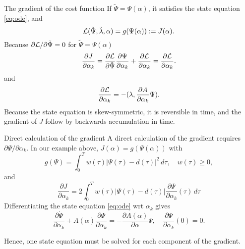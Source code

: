 \documentclass{beamer}
\begin{document}
\begin{frame}{The gradient of the cost function}
  If $\tilde{\Psi} = \Psi(\alpha)$, it satisfies the state equation \eqref{eq:ode}, and
  \[
    {\cal L}(\tilde{\Psi},\tilde{\lambda},\alpha) =
    g(\Psi(\alpha)) := J(\alpha).
  \]
Because $\partial {\cal L}/\partial \tilde{\Psi}=0$ for $\tilde{\Psi}=\Psi(\alpha)$
\[
\frac{\partial J}{\partial \alpha_k} = \frac{\partial {\cal L}}{\partial \tilde{\Psi}}
\frac{\partial{\Psi}}{\partial \alpha_k} + \frac{\partial {\cal L}}{\partial \alpha_k} = \frac{\partial
  {\cal L}}{\partial \alpha_k}. 
\]
and
\[
\frac{\partial{\cal L}}{\partial \alpha_k} = - (\lambda,\frac{\partial A}{\partial \alpha_k}\Psi). 
\]
Because the state equation is skew-symmetric, it is reversible in time, and the gradient of $J$
follow by backwards accumulation in time.
\end{frame}

\begin{frame}{Direct calculation of the gradient}
A direct calculation of the gradient requires ${\partial \Psi}/{\partial \alpha_k}$.
In our example above, $J(\alpha) = g(\Psi(\alpha))$ with
\[
g(\Psi) = \int_0^T w(\tau) |\Psi(\tau) - d(\tau)|^2\, d\tau, \quad w(\tau)\geq 0,
\]
and
\[
\frac{\partial J}{\partial \alpha_k} = 2 \int_0^T w(\tau) |\Psi(\tau) - d(\tau)| \frac{\partial
  \Psi}{\partial \alpha_k}(\tau)\, d\tau
\]
Differentiating the state equation \eqref{eq:ode} wrt $\alpha_k$ gives
\[
  \frac{\partial \dot{\Psi}}{\partial \alpha_k} + A(\alpha)\frac{\partial \Psi}{\partial \alpha_k} =
  - \frac{\partial A(\alpha)}{\partial \alpha} \Psi,\quad \frac{\partial \Psi}{\partial \alpha_k}(0)=0.
\]
\end{frame}
Hence, one state equation must be solved for each component of the gradient.
\end{document}
